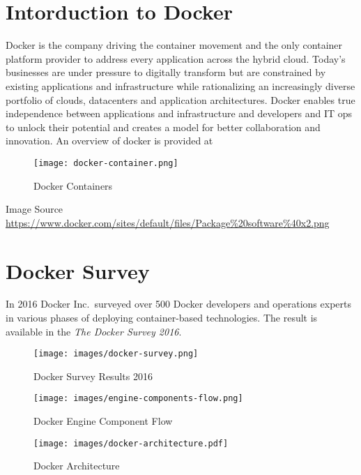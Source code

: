 
\FILENAME

\section{Intorduction to Docker}
\label{Docker}

Docker is the company driving the container movement and the only
container platform provider to address every application across the
hybrid cloud. Today's businesses are under pressure to digitally
transform but are constrained by existing applications and
infrastructure while rationalizing an increasingly diverse portfolio
of clouds, datacenters and application architectures. Docker enables
true independence between applications and infrastructure and
developers and IT ops to unlock their potential and creates a model
for better collaboration and innovation. An overview of docker is
provided at


\begin{figure}[htbp]
\centering
\texttt{[image: docker-container.png]}
\caption{Docker Containers}
\end{figure}

Image Source
\url{https://www.docker.com/sites/default/files/Package\%20software\%40x2.png}


\section{Docker Survey}

In 2016 Docker Inc.\ surveyed over 500 Docker developers and operations
experts in various phases of deploying container-based
technologies. The result is available in the \textit{The Docker Survey
  2016}.


\begin{figure}[htb]
\centering
\texttt{[image: images/docker-survey.png]}
\caption{Docker Survey Results 2016
}
\end{figure}


\begin{figure}[htb]
\centering
\texttt{[image: images/engine-components-flow.png]}
\caption{ Docker Engine Component Flow }
\end{figure}

\begin{figure}[htb]
\centering
\texttt{[image: images/docker-architecture.pdf]}
\caption{ Docker Architecture }
\end{figure}

